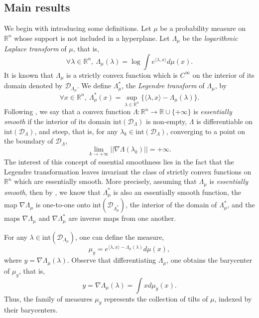 \documentclass[aop,preprint]{imsart}
\newcommand\RR{\mathbb{R}}
\numberwithin{equation}{section}
\theoremstyle{definition}
\theoremstyle{plain}
\theoremstyle{remark}
\begin{document}
\subsection{Main results}
We begin with introducing some definitions.
    Let $\mu$ be a probability measure on $\RR^n$ whose support is not included in a hyperplane. 
Let $\Lambda_\mu$ be the \textit{logarithmic Laplace transform} of $\mu$, that is,
$$\forall \lambda \in \RR^n, \  \Lambda_\mu (\lambda) = \log \int e^{\langle \lambda, x\rangle} d\mu(x).$$
It is known that $\Lambda_\mu$ is a strictly convex function which is $C^{\infty}$ on the interior of its domain denoted by $\mathcal{D}_{\Lambda_\mu}$.
We define  $\Lambda^*_\mu$, the \textit{Legendre transform} of $\Lambda_\mu$, by
$$\forall x \in \RR^n, \ \Lambda^*_\mu(x) = \sup_{\lambda \in \RR^n} \{ \langle \lambda, x\rangle - \Lambda_\mu(\lambda)\}.$$
Following \cite[Section 26]{Rockafeller}, we say that a convex function $\Lambda : \RR^n \to \RR\cup\{+\infty\}$ is \textit{essentially smooth} if the interior of its domain  $\mathrm{int}(\mathcal{D}_{\Lambda})$ is non-empty, $\Lambda$ is differentiable on $\mathrm{int}(\mathcal{D}_{\Lambda})$, and steep, that is, for any $\lambda_k \in \mathrm{int}(\mathcal{D}_{\Lambda})$, converging to a point on the boundary of $\mathcal{D}_{\Lambda}$,
$$   \lim_{k\to +\infty} || \nabla \Lambda(\lambda_k)|| = +\infty.$$
The interest of this concept of essential smoothness lies in the fact that the Legendre transformation leaves invariant the class of strictly convex functions on $\RR^n$  which are essentially smooth. 
More precisely, assuming that $\Lambda_\mu$ is \textit{essentially smooth}, then by \cite[Theorem 26.5]{Rockafeller}, we know that $\Lambda^*_\mu$ is also an essentially smooth function, the map $\nabla \Lambda_\mu$ is one-to-one onto $\mathrm{int}(\mathcal{D}_{\Lambda^*_\mu})$, the interior of the domain of $\Lambda^*_\mu$, and the maps $\nabla \Lambda_\mu$ and $\nabla \Lambda^*_{\mu}$ are inverse maps from one another.

For any $\lambda \in \mathrm{int}(\mathcal{D}_{\Lambda_\mu})$, one can define the measure,
\begin{equation} \label{defmuh} \mu_y =e^{\langle \lambda ,x\rangle -\Lambda_\mu(\lambda)} d\mu(x),\end{equation}
where $y =\nabla \Lambda_\mu(\lambda)$. Observe that differentiating $\Lambda_\mu$, one obtains the barycenter of $\mu_y$, that is,
\begin{equation}\label{barycentermuh} y =  \nabla \Lambda_\mu(\lambda) =\int x d\mu_y(x).\end{equation}
Thus, the family of measures $\mu_y$ represents the collection of tilts of $\mu$, indexed by their barycenters.
\end{document}
